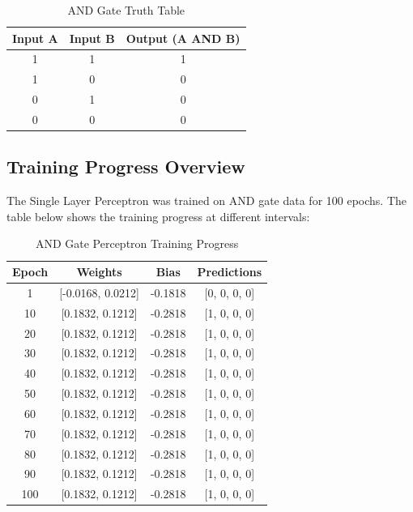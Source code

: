 \documentclass[12pt]{article}
\begin{document}
\begin{table}[H]
\centering
\caption{AND Gate Truth Table}
\renewcommand{\arraystretch}{1.5}
\begin{tabular}{|c|c|c|}
\hline
\textbf{Input A} & \textbf{Input B} & \textbf{Output (A AND B)} \\
\hline
1 & 1 & 1 \\
\hline
1 & 0 & 0 \\
\hline
0 & 1 & 0 \\
\hline
0 & 0 & 0 \\
\hline
\end{tabular}
\end{table}

\subsection*{Training Progress Overview}
The Single Layer Perceptron was trained on AND gate data for 100 epochs. The table below shows the training progress at different intervals:

\begin{table}[H]
\centering
\caption{AND Gate Perceptron Training Progress}
\renewcommand{\arraystretch}{1.5}
\begin{tabular}{|c|c|c|c|}
\hline
\textbf{Epoch} & \textbf{Weights} & \textbf{Bias} & \textbf{Predictions} \\
\hline
1 & [-0.0168, 0.0212] & -0.1818 & [0, 0, 0, 0] \\
\hline
10 & [0.1832, 0.1212] & -0.2818 & [1, 0, 0, 0] \\
\hline
20 & [0.1832, 0.1212] & -0.2818 & [1, 0, 0, 0] \\
\hline
30 & [0.1832, 0.1212] & -0.2818 & [1, 0, 0, 0] \\
\hline
40 & [0.1832, 0.1212] & -0.2818 & [1, 0, 0, 0] \\
\hline
50 & [0.1832, 0.1212] & -0.2818 & [1, 0, 0, 0] \\
\hline
60 & [0.1832, 0.1212] & -0.2818 & [1, 0, 0, 0] \\
\hline
70 & [0.1832, 0.1212] & -0.2818 & [1, 0, 0, 0] \\
\hline
80 & [0.1832, 0.1212] & -0.2818 & [1, 0, 0, 0] \\
\hline
90 & [0.1832, 0.1212] & -0.2818 & [1, 0, 0, 0] \\
\hline
100 & [0.1832, 0.1212] & -0.2818 & [1, 0, 0, 0] \\
\hline
\end{tabular}
\end{table}
\end{document}

